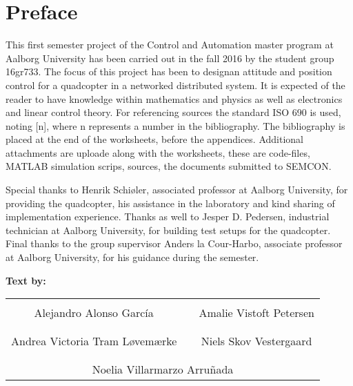 
\chapter*{Preface}
This first semester project of the Control and Automation master program at Aalborg University has been carried out in the fall 2016 by the student group 16gr733. 
The focus of this project has been to designan attitude and position control for a quadcopter in a networked distributed system. 
It is expected of the reader to have knowledge within mathematics and physics as well as electronics and linear control theory.
For referencing sources the standard ISO 690 is used, noting [n], where n represents a number in the bibliography. The bibliography is placed at the end of the worksheets, before the appendices. Additional attachments are uploade along with the worksheets, these are code-files, MATLAB simulation scrips, sources, the documents submitted to SEMCON.

Special thanks to Henrik Schiøler, associated professor at Aalborg University, for providing the quadcopter, his assistance in the laboratory and kind sharing of implementation experience. Thanks as well to Jesper D. Pedersen, industrial technician at Aalborg University, for building test setups for the quadcopter. Final thanks to the group supervisor Anders la Cour-Harbo, associate professor at Aalborg University, for his guidance during the semester.

%
%


\textbf{Text by:}\\
\vspace{-5pt}
\begin{table}[H]
	\centering
		\begin{tabular}{c c c}
			\underline{\phantom{JAERJAERJAERJAERGO}} & \phantom{cookies} & \underline{\phantom{JAERJAERJAERJAERGO}} \\
			Alejandro Alonso García			& \phantom{cookies} & Amalie Vistoft Petersen		\\
			&&\\
			\underline{\phantom{JAERJAERJAERJAERGO}} & \phantom{cookies} & \underline{\phantom{JAERJAERJAERJAERGO}} \\
			Andrea Victoria Tram Løvemærke			& \phantom{cookies} & Niels Skov Vestergaard		\\
			&&\\
	    \multicolumn{3}{c}{\underline{\phantom{JAERJAERJAERJAERGO}}}\\
	    \multicolumn{3}{c}{Noelia Villarmarzo Arruñada}\\				
		\end{tabular}
\end{table}

\pagebreak
\restoregeometry
